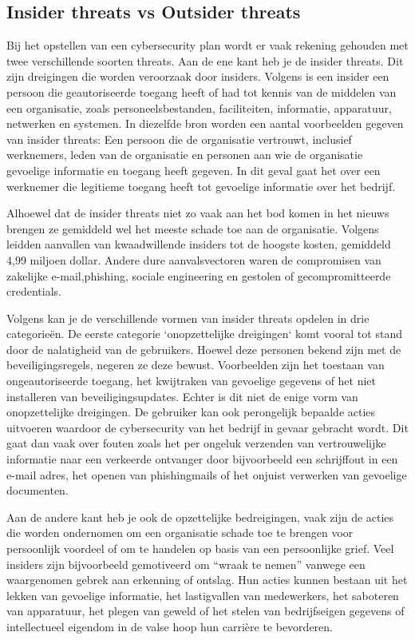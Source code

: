 \subsection{Insider threats vs Outsider threats}
Bij het opstellen van een cybersecurity plan wordt er vaak rekening gehouden met twee verschillende soorten threats. Aan de ene kant heb je de insider threats. Dit zijn dreigingen die worden veroorzaak door insiders. Volgens \textcite{Cisa2025} is een insider een persoon die geautoriseerde toegang heeft of had tot kennis van de middelen van een organisatie, zoals personeelsbestanden, faciliteiten, informatie, apparatuur, netwerken en systemen. In diezelfde bron worden een aantal voorbeelden gegeven van insider threats: Een persoon die de organisatie vertrouwt, inclusief werknemers, leden van de organisatie en personen aan wie de organisatie gevoelige informatie en toegang heeft gegeven. In dit geval gaat het over een werknemer die legitieme toegang heeft tot gevoelige informatie over het bedrijf.

Alhoewel dat de insider threats niet zo vaak aan het bod komen in het nieuws brengen ze gemiddeld wel het meeste schade toe aan de organisatie. Volgens \textcite{ibm2024} leidden aanvallen van kwaadwillende insiders tot de hoogste kosten, gemiddeld 4,99 miljoen dollar. Andere dure aanvalsvectoren waren de compromisen van zakelijke e-mail,phishing, sociale engineering en gestolen of gecompromitteerde credentials. 

Volgens \textcite{Cisa2025} kan je de verschillende vormen van insider threats opdelen in drie categorieën. De eerste categorie `onopzettelijke dreigingen` komt vooral tot stand door de nalatigheid van de gebruikers.  Hoewel deze personen bekend zijn met de beveiligingsregels, negeren ze deze bewust. Voorbeelden zijn het toestaan van ongeautoriseerde toegang, het kwijtraken van gevoelige gegevens of het niet installeren van beveiligingsupdates. Echter is dit niet de enige vorm van onopzettelijke dreigingen. De gebruiker kan ook perongelijk bepaalde acties uitvoeren waardoor de cybersecurity van het bedrijf in gevaar gebracht wordt. Dit gaat dan vaak over fouten zoals het per ongeluk verzenden van vertrouwelijke informatie naar een verkeerde ontvanger door bijvoorbeeld een schrijffout in een e-mail adres, het openen van phishingmails of het onjuist verwerken van gevoelige documenten.

Aan de andere kant heb je ook de opzettelijke bedreigingen, vaak zijn de acties die worden ondernomen om een organisatie schade toe te brengen voor persoonlijk voordeel of om te handelen op basis van een persoonlijke grief. Veel insiders zijn bijvoorbeeld gemotiveerd om “wraak te nemen” vanwege een waargenomen gebrek aan erkenning of ontslag. Hun acties kunnen bestaan uit het lekken van gevoelige informatie, het lastigvallen van medewerkers, het saboteren van apparatuur, het plegen van geweld of het stelen van bedrijfseigen gegevens of intellectueel eigendom in de valse hoop hun carrière te bevorderen.\autocite{Cisa2025}

